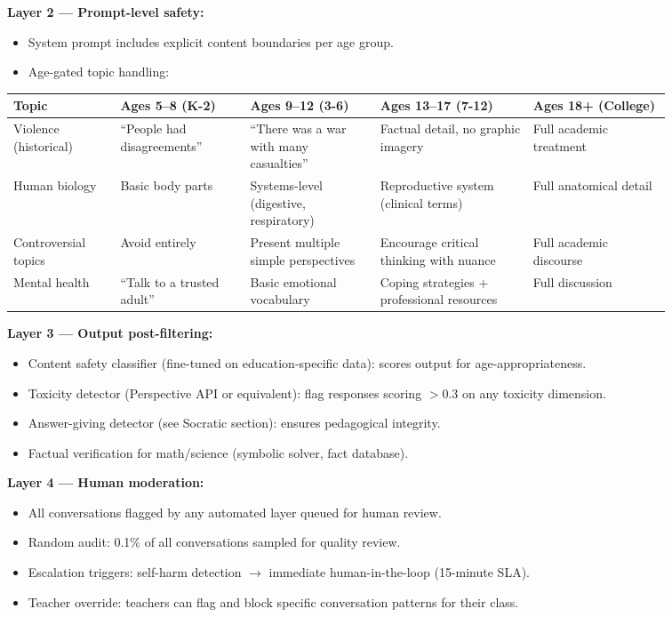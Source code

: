 \textbf{Layer 2 --- Prompt-level safety:}
\begin{itemize}
  \item System prompt includes explicit content boundaries per age group.
  \item Age-gated topic handling:
\end{itemize}

\begin{tabular}{|p{0.14\linewidth}|p{0.17\linewidth}|p{0.17\linewidth}|p{0.20\linewidth}|p{0.18\linewidth}|}
\hline
\textbf{Topic} & \textbf{Ages 5--8 (K-2)} & \textbf{Ages 9--12 (3-6)} & \textbf{Ages 13--17 (7-12)} & \textbf{Ages 18+ (College)} \\
\hline
Violence (historical) & ``People had disagreements'' & ``There was a war with many casualties'' & Factual detail, no graphic imagery & Full academic treatment \\
\hline
Human biology & Basic body parts & Systems-level (digestive, respiratory) & Reproductive system (clinical terms) & Full anatomical detail \\
\hline
Controversial topics & Avoid entirely & Present multiple simple perspectives & Encourage critical thinking with nuance & Full academic discourse \\
\hline
Mental health & ``Talk to a trusted adult'' & Basic emotional vocabulary & Coping strategies + professional resources & Full discussion \\
\hline
\end{tabular}

\textbf{Layer 3 --- Output post-filtering:}
\begin{itemize}
  \item Content safety classifier (fine-tuned on education-specific data): scores output for age-appropriateness.
  \item Toxicity detector (Perspective API or equivalent): flag responses scoring $>$0.3 on any toxicity dimension.
  \item Answer-giving detector (see Socratic section): ensures pedagogical integrity.
  \item Factual verification for math/science (symbolic solver, fact database).
\end{itemize}

\textbf{Layer 4 --- Human moderation:}
\begin{itemize}
  \item All conversations flagged by any automated layer queued for human review.
  \item Random audit: 0.1\% of all conversations sampled for quality review.
  \item Escalation triggers: self-harm detection $\rightarrow$ immediate human-in-the-loop (15-minute SLA).
  \item Teacher override: teachers can flag and block specific conversation patterns for their class.
\end{itemize}

